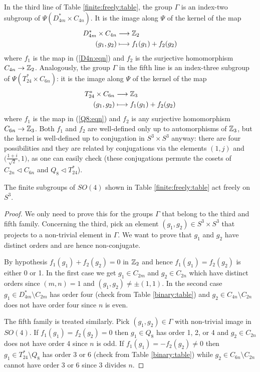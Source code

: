 In the third line of Table \ref{finite:freely:table}, the group $\Gamma$ is an index-two subgroup of $\Psi(D_{4m}^* \times C_{4n})$. It is the image along $\Psi$ of the kernel of the map
\begin{align*}
D^*_{4m} \times C_{4n} & \longrightarrow \mathbb{Z}_2 \\
(g_1, g_2) & \longmapsto f_1(g_1) + f_2(g_2)
\end{align*}
where $f_1$ is the map in (\ref{D4n:eqn}) and $f_2$ is the surjective homomorphism $C_{4n} \to \mathbb{Z}_2$. Analogously, the group $\Gamma$ in the fifth line is an index-three subgroup of $\Psi(T_{24}^* \times C_{6n})$: it is the image along $\Psi$ of the kernel of the map
\begin{align*}
T^*_{24} \times C_{6n} & \longrightarrow \mathbb{Z}_3 \\
(g_1, g_2) & \longmapsto f_1(g_1) + f_2(g_2)
\end{align*}
where $f_1$ is the map in (\ref{Q8:eqn}) and $f_2$ is any surjective homomorphism $C_{6n} \to \mathbb{Z}_3$. Both $f_1$ and $f_2$ are well-defined only up to automorphisms of $\mathbb{Z}_3$, but the kernel is well-defined up to conjugation in $S^3\times S^3$ anyway: there are four possibilities and they are related by conjugations via the elements $(1,j)$ and $\big(\frac{1+i}{\sqrt 2},1\big)$, as one can easily check (these conjugations permute the cosets of $C_{2n} \triangleleft C_{6n}$ and $Q_8 \triangleleft T_{24}^*$).

\begin{prop} \label{finite:SO4:prop}
The finite subgroups of $SO(4)$ shown in Table \ref{finite:freely:table} act freely on $S^3$.
\end{prop}
\begin{proof}
We only need to prove this for the groups $\Gamma$ that belong to the third and fifth family. Concerning the third, pick an element $(g_1,g_2) \in S^3\times S^3$ that projects to a non-trivial element in $\Gamma$. We want to prove that $g_1$ and $g_2$ have distinct orders and are hence non-conjugate.

By hypothesis $f_1(g_1) + f_2(g_2)=0$ in $\mathbb{Z}_2$ and hence $f_1(g_1) = f_2(g_2)$ is either 0 or 1. In the first case we get $g_1 \in C_{2m}$ and $g_2 \in C_{2n}$ which have distinct orders since $(m,n)=1$ and $(g_1,g_2) \neq \pm (1,1)$. In the second case $g_1 \in D_{4m}^* \setminus C_{2m}$ has order four (check from Table \ref{binary:table}) and $g_2 \in C_{4n} \setminus C_{2n}$ does not have order four since $n$ is even. 

The fifth family is treated similarly. Pick $(g_1, g_2) \in \Gamma$ with non-trivial image in $SO(4)$. If $f_1(g_1) = f_2(g_2) = 0$ then $g_1 \in Q_8$ has order 1, 2, or 4 and $g_2 \in C_{2n}$ does not have order 4 since $n$ is odd. If $f_1(g_1) = - f_2(g_2) \neq 0$ then $g_1\in T_{24}^* \setminus Q_8$ has order 3 or 6 (check from Table \ref{binary:table}) while $g_2 \in C_{6n} \setminus C_{2n}$ cannot have order 3 or 6 since $3$ divides $n$.
\end{proof}

